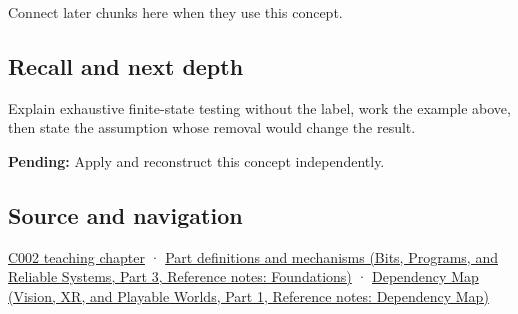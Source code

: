 \hypertarget{appendix-05db24ccc28a-used-by}{}

Connect later chunks here when they use this concept.

\subsection{Recall and next depth}\label{appendix-05db24ccc28a-recall-and-next-depth}

\hypertarget{appendix-05db24ccc28a-recall-and-next-depth}{}

Explain exhaustive finite-state testing without the label, work the example above, then state the assumption whose removal would change the result.

\textbf{Pending:} Apply and reconstruct this concept independently.

\subsection{Source and navigation}\label{appendix-05db24ccc28a-source-and-navigation}

\hypertarget{appendix-05db24ccc28a-source-and-navigation}{}

\hyperref[01-foundations-i-ch001-arithmetic-becomes-a-policy]{C002 teaching chapter} · \href{../01-Bits-Programs-and-Reliable-Systems-P03/main.pdf\#nameddest=appendix-fd090d982a15}{Part definitions and mechanisms (Bits, Programs, and Reliable Systems, Part 3, Reference notes: Foundations)} · \href{../07-Vision-XR-and-Playable-Worlds-P01/main.pdf\#nameddest=appendix-4ad47bdd269a}{Dependency Map (Vision, XR, and Playable Worlds, Part 1, Reference notes: Dependency Map)}
